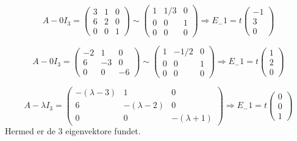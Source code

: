\documentclass[12pt]{article}
\begin{document}
\begin{enumerate}[(a)]
$$
A-0 I_3 = \left(\begin{array}{ccc}
3&1&0\\
6&2&0\\
0&0&1
\end{array}\right)\sim
\left(\begin{array}{ccc}
1&1/3&0\\
0&0&1\\
0&0&0
\end{array}\right) \Rightarrow E_-1 = t
\left(\begin{array}{ccc}
-1\\
3\\
0
\end{array}\right)
$$

$$
A-0 I_3 = \left(\begin{array}{ccc}
-2&1&0\\
6&-3&0\\
0&0&-6
\end{array}\right)\sim
\left(\begin{array}{ccc}
1&-1/2&0\\
0&0&1\\
0&0&0
\end{array}\right) \Rightarrow E_-1 = t
\left(\begin{array}{ccc}
1\\
2\\
0
\end{array}\right)
$$

$$
A-\lambda I_3 = \left(\begin{array}{ccc}
-(\lambda-3)&1&0\\
6&-(\lambda-2)&0\\
0&0&-(\lambda+1)
\end{array}\right) \Rightarrow E_-1 = t
\left(\begin{array}{ccc}
0\\
0\\
1
\end{array}\right)
$$
Hermed er de 3 eigenvektore fundet.
\end{enumerate}
\end{document}
